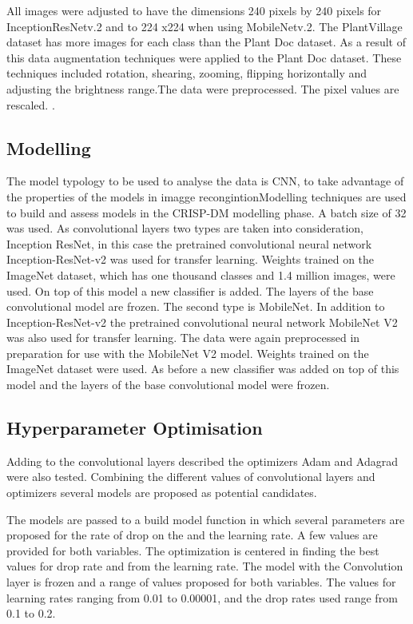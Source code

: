 \documentclass[conference]{IEEEtran}
\begin{document}
All images were adjusted to have the dimensions 240 pixels by 240 pixels for InceptionResNetv.2 and to 224 x224 when using MobileNetv.2. The PlantVillage dataset has more images for each class than the Plant Doc dataset. As a result of this data augmentation techniques were applied to the Plant Doc dataset. These techniques included rotation, shearing, zooming, flipping horizontally and adjusting the brightness range.The data were preprocessed. The pixel values are rescaled. . 
\subsection{Modelling}
    The model typology to be used to analyse the data is CNN, to take advantage of the properties of the models in imagge recongintionModelling techniques are used to build and assess models in the CRISP-DM modelling phase. A batch size of 32 was used. As convolutional layers two types are taken into consideration, Inception ResNet, in this case the pretrained convolutional neural network Inception-ResNet-v2 was used for transfer learning. Weights trained on the ImageNet dataset, which has one thousand classes and 1.4 million images, were used. On top of this model a new classifier is added. The layers of the base convolutional model are frozen. The second type is MobileNet. In addition to Inception-ResNet-v2 the pretrained convolutional neural network MobileNet V2 was also used for transfer learning. The data were again preprocessed in preparation for use with the MobileNet V2 model. Weights trained on the ImageNet dataset were used. As before a new classifier was added on top of this model and the layers of the base convolutional model were frozen.  
\subsection{Hyperparameter Optimisation}
Adding to the convolutional layers described the optimizers Adam and Adagrad were also tested. Combining the different values of convolutional layers and optimizers several models are proposed as potential candidates.\

 The models are passed to a build model function in which several parameters are proposed for the rate of drop on the and the learning rate. A few values are provided for both variables. The optimization is centered in finding the best values for drop rate and from the learning rate. The model with the Convolution layer is frozen and a range of values proposed for both variables. The values for learning rates ranging from 0.01 to 0.00001, and the drop rates used range from 0.1 to 0.2.\
\end{document}
